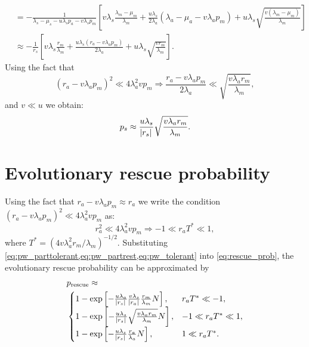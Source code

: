 \documentclass[12pt]{extarticle}
\newcommand{\presc}{p_\text{rescue}}
\renewcommand{\Delta}{r}
\begin{document}
\begin{appendices}
\begin{equation}
\begin{aligned}
&=-\frac{1}{\lambda_s-\mu_s-u\lambda_sp_a-v\lambda_sp_m}\left[v\lambda_s\frac{\lambda_m-\mu_m} {\lambda_m}+\frac{u\lambda_s}{2\lambda_a}\left(\lambda_a-\mu_a-v\lambda_ap_m\right)+u\lambda_s\sqrt{\frac{v\left(\lambda_m-\mu_m\right)}{\lambda_m}}\right]\\ %
&\approx-\frac{1}{\Delta_s}\left[v\lambda_s\frac{\Delta_m}{\lambda_m}+\frac{u\lambda_s\left(\Delta_a-v\lambda_ap_m\right)}{2\lambda_a}+u\lambda_s\sqrt{\frac{v\Delta_m}{\lambda_m}}\right]. %
\end{aligned}
\end{equation}
Using the fact that
\begin{equation*}
\left(\Delta_a-v\lambda_ap_m\right)^2 \ll 4\lambda_a^2vp_m\Rightarrow\frac{\Delta_a-v\lambda_ap_m}{2\lambda_a} \ll \sqrt{\frac{v\lambda_a\Delta_m}{\lambda_m}},
\end{equation*}
and $v\ll u$ we obtain:
\begin{equation}\label{eq:pw_partrest}
p_s\approx\frac{u\lambda_s}{\abs{\Delta_s}} \sqrt{\frac{v\lambda_a\Delta_m}{\lambda_m}}.
\end{equation}

\section{Evolutionary rescue probability}\label{sec:appendix-rescue-prob}
Using the fact that $\Delta_a-v\lambda_ap_m\approx\Delta_a$ we write the condition $\left(\Delta_a-v\lambda_ap_m\right)^2 \ll 4\lambda_a^2vp_m$ as:
\begin{equation*}
\Delta_a^2 \ll 4\lambda_a^2vp_m\Rightarrow -1\ll\Delta_aT^*\ll1,
\end{equation*}
where $T^* = (4 v \lambda_a^2 \Delta_m/\lambda_m)^{-1/2}$.
Substituting \cref{eq:pw_parttolerant,eq:pw_partrest,eq:pw_tolerant} into \cref{eq:rescue_prob}, the evolutionary rescue probability can be approximated by
\begin{equation}\label{rescue_prob_approx}
\begin{aligned}
&\presc \approx \\
  &\begin{cases}
   1-\exp\left[-\frac{u\lambda_a}{\abs{\Delta_s}} \frac{v\lambda_s}{\abs{\Delta_a}} \frac{\Delta_m}{\lambda_m}  N\right] ,&
   \Delta_aT^*\ll-1 ,\\
   1-\exp\left[-\frac{u\lambda_s}{\abs{\Delta_s}} \sqrt{\frac{v\lambda_a\Delta_m}{\lambda_m}} N\right] ,&
  -1\ll\Delta_aT^*\ll1 ,\\
   1-\exp\left[-\frac{u\lambda_s}{\abs{\Delta_s}}  \frac{\Delta_a}{\lambda_a}  N\right] ,&
   1\ll\Delta_aT^*.
  \end{cases}
\end{aligned}
\end{equation}


\end{appendices}
\end{document}
